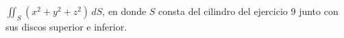 \item $\iint_S (x^2 + y^2 + z^2) \, dS$, en donde $S$ consta del cilindro del ejercicio 9 junto con sus discos superior e inferior.
